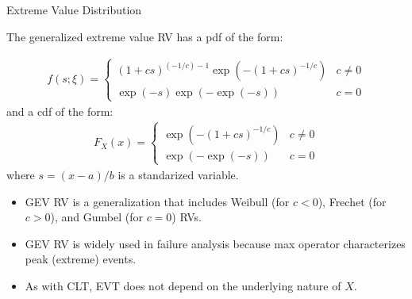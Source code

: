 \documentclass[9pt]{beamer}
\begin{document}
%
\begin{frame}{Extreme Value Distribution}

The generalized extreme value RV has a pdf of the form:
\begin{block}{}
\begin{align*}
f(s;\xi) = \begin{cases}(1+c s)^{(-1/c)-1} \exp(-(1+c s)^{-1/c}) & c\neq0 \\
\exp(-s) \exp(-\exp(-s)) & c = 0\end{cases}
\end{align*}
and a cdf of the form:
\begin{align*}
F_X(x)= \begin{cases}\exp(-(1+c s)^{-1/c}) & c\neq0 \\ \exp(-\exp(-s)) & c = 0\end{cases}
\end{align*}
where $s=(x-a)/b$ is a standarized variable. 
\end{block}
\begin{itemize}
\item GEV RV is a generalization that includes Weibull (for $c<0$), Frechet (for $c>0$), and Gumbel (for $c=0$) RVs. 


\item GEV RV is widely used in failure analysis because max operator characterizes peak (extreme) events. 

\item As with CLT,  EVT does not depend on the underlying nature of $X$. 

\end{itemize}


\end{frame}
\end{document}
